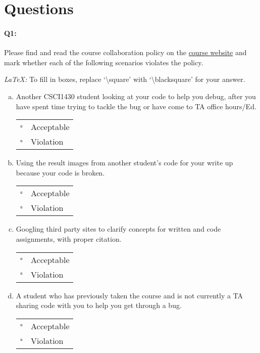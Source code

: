 \documentclass[11pt]{article}
\begin{document}
\section*{Questions}

\paragraph{Q1:} Please find and read the course collaboration policy on the \href{https://browncsci1430.github.io/webpage/#policy-section}{course website} and mark whether each of the following scenarios violates the policy.

\emph{LaTeX:} To fill in boxes, replace `\textbackslash square' with `\textbackslash blacksquare' for your answer.

\begin{enumerate}[(a)]
\item
Another CSCI1430 student looking at your code to help you debug, after you have spent time trying to tackle the bug or have come to TA office hours/Ed.

\begin{tabular}[h]{ll}
$\square$ & Acceptable \\
$\square$ & Violation \\
\end{tabular}

\item
Using the result images from another student's code for your write up because your code is broken.

\begin{tabular}[h]{ll}
$\square$ & Acceptable \\
$\square$ & Violation \\
\end{tabular}

\item
Googling third party sites to clarify concepts for written and code assignments, with proper citation.

\begin{tabular}[h]{ll}
$\square$ & Acceptable \\
$\square$ & Violation \\
\end{tabular}

\item
A student who has previously taken the course and is not currently a TA sharing code with you to help you get through a bug.

\begin{tabular}[h]{ll}
$\square$ & Acceptable \\
$\square$ & Violation \\
\end{tabular}

\end{enumerate}
\end{document}
